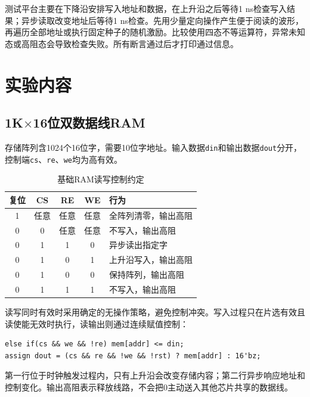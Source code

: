 \documentclass[12pt,a4paper]{ctexart}
\begin{document}
测试平台主要在下降沿安排写入地址和数据，在上升沿之后等待1 ns检查写入结果；异步读取改变地址后等待1 ns检查。先用少量定向操作产生便于阅读的波形，再遍历全部地址或执行固定种子的随机激励。比较使用四态不等运算符，异常未知态或高阻态会导致检查失败。所有断言通过后才打印通过信息。

\section{实验内容}
\subsection{1K$\times$16位双数据线RAM}
存储阵列含1024个16位字，需要10位字地址。输入数据\texttt{din}和输出数据\texttt{dout}分开，控制端\texttt{cs}、\texttt{re}、\texttt{we}均为高有效。
\begin{table}[H]
\centering
\caption{基础RAM读写控制约定}
\begin{tabular}{ccccl}
\toprule
复位 & CS & RE & WE & 行为\\
\midrule
1 & 任意 & 任意 & 任意 & 全阵列清零，输出高阻\\
0 & 0 & 任意 & 任意 & 不写入，输出高阻\\
0 & 1 & 1 & 0 & 异步读出指定字\\
0 & 1 & 0 & 1 & 上升沿写入，输出高阻\\
0 & 1 & 0 & 0 & 保持阵列，输出高阻\\
0 & 1 & 1 & 1 & 不写入，输出高阻\\
\bottomrule
\end{tabular}
\end{table}
读写同时有效时采用确定的无操作策略，避免控制冲突。写入过程只在片选有效且读使能无效时执行，读输出则通过连续赋值控制：
\begin{lstlisting}
else if(cs && we && !re) mem[addr] <= din;
assign dout = (cs && re && !we && !rst) ? mem[addr] : 16'bz;
\end{lstlisting}
第一行位于时钟触发过程内，只有上升沿会改变存储内容；第二行异步响应地址和控制变化。输出高阻表示释放线路，不会把0主动送入其他芯片共享的数据线。
\end{document}
